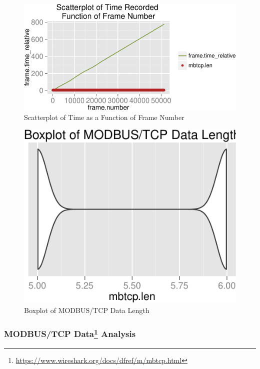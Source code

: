 \documentclass[12pt,]{article}
\let\rmarkdownfootnote\footnote%
\def\footnote{\protect\rmarkdownfootnote}
\begin{document}
\newpage

\begin{figure}

{\centering \includegraphics{thesis_files/figure-latex/unnamed-chunk-28-1} 

}

\caption{Scatterplot of Time as a Function of Frame Number}\label{fig:unnamed-chunk-28}
\end{figure}

\nopagebreak

\begin{figure}

{\centering \includegraphics{thesis_files/figure-latex/unnamed-chunk-29-1} 

}

\caption{Boxplot of MODBUS/TCP Data Length}\label{fig:unnamed-chunk-29}
\end{figure}

\subsubsection[MODBUS/TCP Data Analysis]{MODBUS/TCP Data\footnote{\url{https://www.wireshark.org/docs/dfref/m/mbtcp.html}}
Analysis}\label{modbustcp-data6-analysis}
\end{document}
